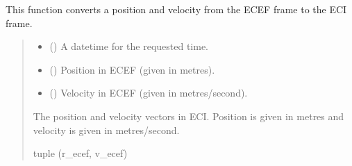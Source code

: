 \documentclass[letterpaper,10pt,english]{sphinxmanual}
\begin{document}

\begin{fulllineitems}
\label{\detokenize{modules/util/transformations:qnav.util.transformations.eci2ecef}}
\pysigstartsignatures
{}
\pysigstopsignatures
\sphinxAtStartPar
This function converts a position and velocity from the ECEF frame to the
ECI frame.
\begin{quote}\begin{description}
\begin{itemize}
\item {} 
\sphinxAtStartPar
{} () \textendash{} A datetime for the requested time.

\item {} 
\sphinxAtStartPar
{} (\sphinxstyleliteralemphasis{\sphinxupquote{ (}}\sphinxstyleliteralemphasis{\sphinxupquote{)}}) \textendash{} Position in ECEF (given in metres).

\item {} 
\sphinxAtStartPar
{} (\sphinxstyleliteralemphasis{\sphinxupquote{ (}}\sphinxstyleliteralemphasis{\sphinxupquote{)}}) \textendash{} Velocity in ECEF (given in metres/second).

\end{itemize}

\sphinxAtStartPar
The position and velocity vectors in ECI. Position is given in
metres and velocity is given in metres/second.

\sphinxAtStartPar
tuple (r\_ecef, v\_ecef)

\end{description}\end{quote}

\end{fulllineitems}
\end{document}

